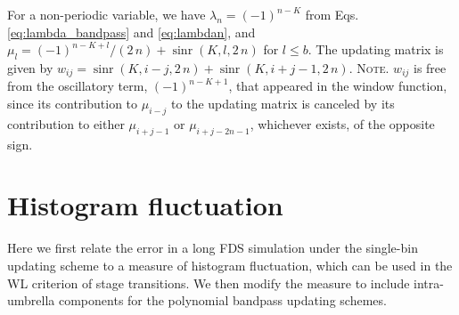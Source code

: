 \documentclass[preprint, superscriptaddress, floatfix]{revtex4-1}
\newcommand{\note}[1]{{\color{DarkGreen}\footnotesize \textsc{Note.} #1}}
\begin{document}
For a non-periodic variable,
we have $\lambda_n = (-1)^{n-K}$
from Eqs. \eqref{eq:lambda_bandpass} and \eqref{eq:lambdan},
and $\mu_l = (-1)^{n-K+l}/(2 \, n) + \operatorname{sinr}(K, l, 2 \, n)$
for $l \le b$.
%
The updating matrix is given by
$w_{ij} = \operatorname{sinr}(K, i-j, 2 \, n) + \operatorname{sinr}(K, i+j-1, 2 \, n)$.
%
\note{$w_{ij}$
  is free from the oscillatory term, $(-1)^{n-K+1}$,
  that appeared in the window function, since
  its contribution to $\mu_{i-j}$ to the updating matrix
  is canceled by its contribution to either $\mu_{i+j-1}$
  or $\mu_{i+j-2n-1}$,
  whichever exists, of the opposite sign.}
%



\section{\label{sec:hfluc}
Histogram fluctuation}


Here we first relate the error
in a long FDS simulation under the single-bin updating scheme
to a measure of histogram fluctuation,
which can be used in the WL criterion of stage transitions.
%
We then modify the measure
to include intra-umbrella components for
the polynomial bandpass updating schemes.

\end{document}
